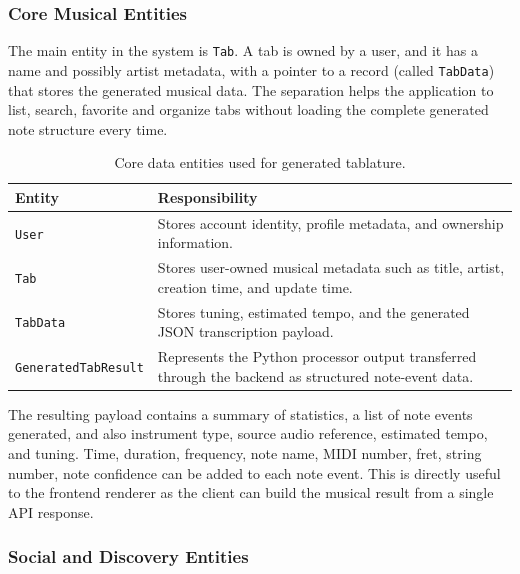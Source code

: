 \documentclass[a4paper, 12pt, titlepage]{article}
\begin{document}
\subsubsection{Core Musical Entities}

The main entity in the system is \texttt{Tab}. A tab is owned by a user, and it has a name and possibly artist metadata, with a pointer to a record (called \texttt{TabData}) that stores the generated musical data. The separation helps the application to list, search, favorite and organize tabs without loading the complete generated note structure every time.

\begin{table}[H]
    \centering
    \begin{tabular}{|p{}|p{}|}
        \hline
        \textbf{Entity} & \textbf{Responsibility} \\
        \hline
        \texttt{User} & Stores account identity, profile metadata, and ownership information. \\
        \hline
        \texttt{Tab} & Stores user-owned musical metadata such as title, artist, creation time, and update time. \\
        \hline
        \texttt{TabData} & Stores tuning, estimated tempo, and the generated JSON transcription payload. \\
        \hline
        \texttt{GeneratedTabResult} & Represents the Python processor output transferred through the backend as structured note-event data. \\
        \hline
    \end{tabular}
    \caption{Core data entities used for generated tablature.}
    \label{tab:tabee_core_entities}
\end{table}

The resulting payload contains a summary of statistics, a list of note events generated, and also instrument type, source audio reference, estimated tempo, and tuning. Time, duration, frequency, note name, MIDI number, fret, string number, note confidence can be added to each note event. This is directly useful to the frontend renderer as the client can build the musical result from a single API response.

\subsubsection{Social and Discovery Entities}
\end{document}
